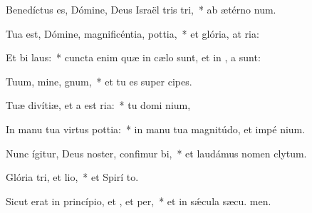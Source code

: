 \item Benedíctus es, Dómine, Deus Israël tris tri,~* ab ætérno  num.
\item Tua est, Dómine, magnificéntia,  pottia,~* et glória, at ria:
\item Et bi laus:~* cuncta enim quæ in cælo sunt, et in , a sunt:
\item Tuum, mine, gnum,~* et tu es super  cipes.
\item Tuæ divítiæ, et a est ria:~* tu domi nium,
\item In manu tua virtus  pottia:~* in manu tua magnitúdo, et impé nium.
\item Nunc ígitur, Deus noster, confimur bi,~* et laudámus nomen  clytum.
\item Glória tri, et lio,~* et Spirí to.
\item Sicut erat in princípio, et , et per,~* et in sǽcula sæcu. men.
